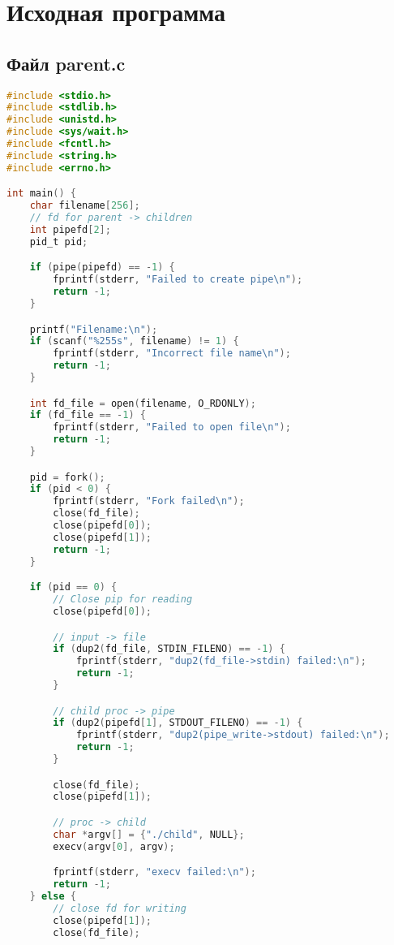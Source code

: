 \section{Исходная программа}


\subsection*{Файл parent.c}

\begin{lstlisting}[language=C,caption={Код программы родительского процесса},captionpos=b]
#include <stdio.h>
#include <stdlib.h>
#include <unistd.h>
#include <sys/wait.h>
#include <fcntl.h>
#include <string.h>
#include <errno.h>

int main() {
    char filename[256];
    // fd for parent -> children
    int pipefd[2];
    pid_t pid;

    if (pipe(pipefd) == -1) {
        fprintf(stderr, "Failed to create pipe\n");
        return -1;
    }

    printf("Filename:\n");
    if (scanf("%255s", filename) != 1) {
        fprintf(stderr, "Incorrect file name\n");
        return -1;
    }

    int fd_file = open(filename, O_RDONLY);
    if (fd_file == -1) {
        fprintf(stderr, "Failed to open file\n");
        return -1;
    }

    pid = fork();
    if (pid < 0) {
        fprintf(stderr, "Fork failed\n");
        close(fd_file);
        close(pipefd[0]);
        close(pipefd[1]);
        return -1;
    }

    if (pid == 0) {
        // Close pip for reading
        close(pipefd[0]);

        // input -> file
        if (dup2(fd_file, STDIN_FILENO) == -1) {
            fprintf(stderr, "dup2(fd_file->stdin) failed:\n");
            return -1;
        }

        // child proc -> pipe
        if (dup2(pipefd[1], STDOUT_FILENO) == -1) {
            fprintf(stderr, "dup2(pipe_write->stdout) failed:\n");
            return -1;
        }

        close(fd_file);
        close(pipefd[1]);

        // proc -> child
        char *argv[] = {"./child", NULL};
        execv(argv[0], argv);

        fprintf(stderr, "execv failed:\n");
        return -1;
    } else {
        // close fd for writing
        close(pipefd[1]);
        close(fd_file);


\end{lstlisting}
